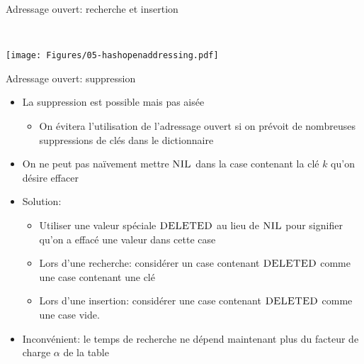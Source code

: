 \begin{frame}{Adressage ouvert: recherche et insertion}

\begin{center}
~~~

\end{center}

\centerline{\texttt{[image: Figures/05-hashopenaddressing.pdf]}}


\end{frame}

\begin{frame}{Adressage ouvert: suppression}
\begin{itemize}
\item La suppression est possible mais pas aisée
\begin{itemize}
\item On évitera l'utilisation de l'adressage ouvert si on prévoit de nombreuses suppressions de clés dans le dictionnaire
\end{itemize}
\item On ne peut pas naïvement mettre $\textnormal{\scshape NIL}$ dans la case contenant la clé $k$ qu'on désire effacer%
\item Solution:
\begin{itemize}
\item Utiliser une valeur spéciale $\textnormal{\scshape DELETED}$ au lieu
  de $\textnormal{\scshape NIL}$ pour signifier qu'on a effacé une valeur dans cette case
\item Lors d'une recherche: considérer un case contenant
  $\textnormal{\scshape DELETED}$ comme une case contenant une clé
\item Lors d'une insertion: considérer une case contenant $\textnormal{\scshape DELETED}$ comme une case vide.
\end{itemize}
\item Inconvénient: le temps de recherche ne dépend maintenant plus du facteur de charge $\alpha$ de la table%
\end{itemize}
\end{frame}

